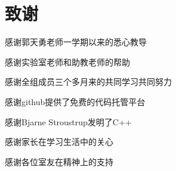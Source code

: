 
\chapter*{致谢}
感谢郭天勇老师一学期以来的悉心教导

感谢实验室老师和助教老师的帮助

感谢全组成员三个多月来的共同学习共同努力

感谢github提供了免费的代码托管平台

感谢Bjarne Stroustrup发明了C++

感谢家长在学习生活中的关心

感谢各位室友在精神上的支持
